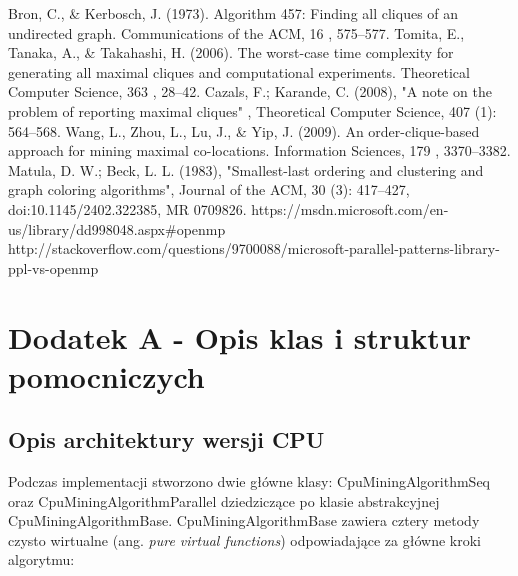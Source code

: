 \documentclass[12pt]{article}
\begin{document}
\begin{thebibliography}{}
Bron, C., \& Kerbosch, J. (1973). Algorithm 457: Finding all cliques of an undirected graph. Communications of the ACM, 16 , 575–577.
Tomita, E., Tanaka, A., \& Takahashi, H. (2006). The worst-case time complexity for
generating all maximal cliques and computational experiments. Theoretical Computer Science, 363 , 28–42.
Cazals, F.; Karande, C. (2008), "A note on the problem of reporting maximal cliques" , Theoretical Computer Science, 407 (1): 564–568.
Wang, L., Zhou, L., Lu, J., \& Yip, J. (2009). An order-clique-based approach for mining maximal co-locations. Information Sciences, 179 , 3370–3382.
Matula, D. W.; Beck, L. L. (1983), "Smallest-last ordering and clustering and graph coloring algorithms", Journal of the ACM, 30 (3): 417–427, doi:10.1145/2402.322385, MR 0709826.
https://msdn.microsoft.com/en-us/library/dd998048.aspx\#openmp
http://stackoverflow.com/questions/9700088/microsoft-parallel-patterns-library-ppl-vs-openmp
\end{thebibliography}

\newpage

\appendix

\section{Dodatek A - Opis klas i struktur pomocniczych}

\subsection{Opis architektury wersji CPU}

Podczas implementacji stworzono dwie główne klasy: CpuMiningAlgorithmSeq oraz CpuMiningAlgorithmParallel dziedziczące po klasie abstrakcyjnej CpuMiningAlgorithmBase. CpuMiningAlgorithmBase zawiera cztery metody czysto wirtualne (ang. \textit{pure virtual functions}) odpowiadające za główne kroki algorytmu:
\end{document}
